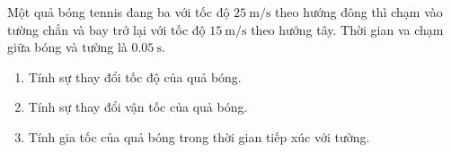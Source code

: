 \begin{ex}
	Một quả bóng tennis đang ba với tốc độ $\SI{25}{\meter/\second}$ theo hướng đông thì chạm vào tường chắn và bay trở lại với tốc độ $\SI{15}{\meter/\second}$ theo hướng tây. Thời gian va chạm giữa bóng và tường là $\SI{0.05}{\second}$.
	\begin{enumerate}[label=\alph*)]
		\item Tính sự thay đổi tốc độ của quả bóng.
		\item Tính sự thay đổi vận tốc của quả bóng.
		\item Tính gia tốc của quả bóng trong thời gian tiếp xúc với tường.
	\end{enumerate}
\end{ex}

